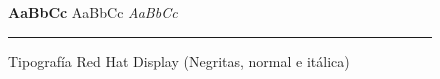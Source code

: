 \vspace{1em}
\begin{figure}[H]
    \centering
    {\sffamily\LARGE\selectfont \textbf{AaBbCc} \quad  AaBbCc \quad \textit{AaBbCc}}
    \vspace{1em}
    \textcolor{Primario}{\rule{\linewidth}{0.2pt}}
    \vspace*{-2em}
    \caption{Tipografía Red Hat Display (Negritas, normal e itálica)}
    \label{fig:tipografía_red_hat_display}
\end{figure}